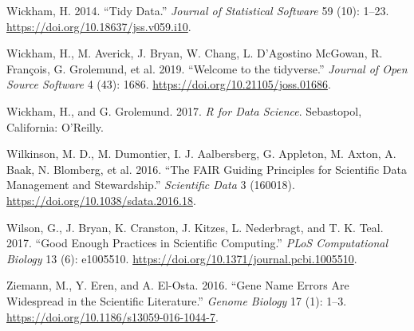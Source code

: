 \documentclass[
  letterpaper,
  DIV=11,
  numbers=noendperiod]{scrreprt}
\newlength{\cslhangindent}
\newlength{\cslentryspacingunit} %
\newenvironment{CSLReferences}[2] %
 {%
  \setlength{\parindent}{0pt}
  \ifodd #1
  \let\oldpar\par
  \def\par{\hangindent=\cslhangindent\oldpar}
  \fi
  \setlength{\parskip}{#2\cslentryspacingunit}
 }%
 {}
\begin{document}
\begin{CSLReferences}{1}{0}
\leavevmode{}%
Wickham, H. 2014. {``Tidy Data.''} \emph{Journal of Statistical
Software} 59 (10): 1--23. \url{https://doi.org/10.18637/jss.v059.i10}.

\leavevmode{}%
Wickham, H., M. Averick, J. Bryan, W. Chang, L. D'Agostino McGowan, R.
François, G. Grolemund, et al. 2019. {``Welcome to the {tidyverse}.''}
\emph{Journal of Open Source Software} 4 (43): 1686.
\url{https://doi.org/10.21105/joss.01686}.

\leavevmode{}%
Wickham, H., and G. Grolemund. 2017. \emph{R for Data Science}.
Sebastopol, California: O'Reilly.

\leavevmode{}%
Wilkinson, M. D., M. Dumontier, I. J. Aalbersberg, G. Appleton, M.
Axton, A. Baak, N. Blomberg, et al. 2016. {``The FAIR Guiding Principles
for Scientific Data Management and Stewardship.''} \emph{Scientific
Data} 3 (160018). \url{https://doi.org/10.1038/sdata.2016.18}.

\leavevmode{}%
Wilson, G., J. Bryan, K. Cranston, J. Kitzes, L. Nederbragt, and T. K.
Teal. 2017. {``Good Enough Practices in Scientific Computing.''}
\emph{PLoS Computational Biology} 13 (6): e1005510.
\url{https://doi.org/10.1371/journal.pcbi.1005510}.

\leavevmode{}%
Ziemann, M., Y. Eren, and A. El-Osta. 2016. {``Gene Name Errors Are
Widespread in the Scientific Literature.''} \emph{Genome Biology} 17
(1): 1--3. \url{https://doi.org/10.1186/s13059-016-1044-7}.

\end{CSLReferences}
\end{document}
